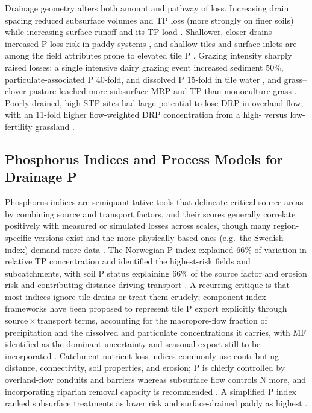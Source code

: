 \documentclass[11pt]{article}
\begin{document}
Drainage geometry alters both amount and pathway of loss. Increasing drain spacing reduced
subsurface volumes and TP loss (more strongly on finer soils) while increasing surface runoff and
its TP load \parencite{Morrison2013}. Shallower, closer drains increased P-loss risk in paddy
systems \parencite{DarziNaftchali2016}, and shallow tiles and surface inlets are among the field
attributes prone to elevated tile P \parencite{King2015}. Grazing intensity sharply raised losses:
a single intensive dairy grazing event increased sediment 50\%, particulate-associated P 40-fold,
and dissolved P 15-fold in tile water \parencite{Gillingham2000}, and grass--clover pasture leached
more subsurface MRP and TP than monoculture grass \parencite{Hooda1999}. Poorly drained,
high-STP sites had large potential to lose DRP in overland flow, with an 11-fold higher
flow-weighted DRP concentration from a high- versus low-fertility grassland
\parencite{Kurz2005}.

\subsection{Phosphorus Indices and Process Models for Drainage P}

Phosphorus indices are semiquantitative tools that delineate critical source areas by combining
source and transport factors, and their scores generally correlate positively with measured or
simulated losses across scales, though many region-specific versions exist and the more
physically based ones (e.g.\ the Swedish index) demand more data
\parencite{Buczko2007}. The Norwegian P index explained 66\% of variation in relative TP
concentration and identified the highest-risk fields and subcatchments, with soil P status
explaining 66\% of the source factor and erosion risk and contributing distance driving transport
\parencite{Bechmann2007}. A recurring critique is that most indices ignore tile drains or treat
them crudely; component-index frameworks have been proposed to represent tile P export explicitly
through source\,$\times$\,transport terms, accounting for the macropore-flow fraction of
precipitation and the dissolved and particulate concentrations it carries, with MF identified as
the dominant uncertainty and seasonal export still to be incorporated
\parencite{Reid2012}. Catchment nutrient-loss indices commonly use contributing distance,
connectivity, soil properties, and erosion; P is chiefly controlled by overland-flow conduits and
barriers whereas subsurface flow controls N more, and incorporating riparian removal capacity is
recommended \parencite{Pärn2012}. A simplified P index ranked subsurface treatments as lower risk
and surface-drained paddy as highest \parencite{DarziNaftchali2016}.
\end{document}

